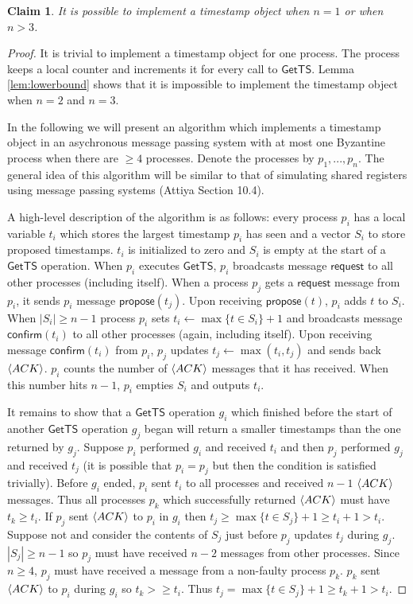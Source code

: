 \documentclass[11pt]{article}
\newcommand\GetTS{\mathsf{GetTS}}
\newcommand\request{\mathsf{request}}
\newcommand\propose{\mathsf{propose}}
\newcommand\confirm{\mathsf{confirm}}
\newtheorem{claim}[theorem]{Claim}
\DeclarePairedDelimiter\anglebrac{\langle}{\rangle}
\begin{document}
\begin{claim}
It is possible to implement a timestamp object when $n = 1$ or when $n > 3$.
\end{claim}
\begin{proof}
It is trivial to implement a timestamp object for one process. The process keeps a local counter and increments it for every call to $\GetTS$. Lemma \ref{lem:lowerbound} shows that it is impossible to implement the timestamp object when $n = 2$ and $n = 3$. 

In the following we will present an algorithm which implements a timestamp object in an asychronous message passing system with at most one Byzantine process when there are $\geq 4$ processes. Denote the processes by $p_1, ..., p_n$. The general idea of this algorithm will be similar to that of simulating shared registers using message passing systems (Attiya Section 10.4).

A high-level description of the algorithm is as follows: every process $p_i$ has a local variable $t_i$ which stores the largest timestamp $p_i$ has seen and a vector $S_i$ to store proposed timestamps. $t_i$ is initialized to zero and $S_i$ is empty at the start of a $\GetTS$ operation. When $p_i$ executes $\GetTS$, $p_i$ broadcasts message $\request$ to all other processes (including itself). When a process $p_j$ gets a $\request$ message from $p_i$, it sends $p_i$ message $\propose(t_j)$. Upon receiving $\propose(t)$, $p_i$ adds $t$ to $S_i$. When $|S_i| \geq n-1$ process $p_i$ sets $t_i \leftarrow \max \{t \in S_i\} + 1$ and broadcasts message $\confirm(t_i)$ to all other processes (again, including itself). Upon receiving message $\confirm(t_i)$ from $p_i$, $p_j$ updates $t_j \leftarrow \max(t_i,t_j)$ and sends back $\anglebrac{ACK}$. $p_i$ counts the number of $\anglebrac{ACK}$ messages that it has received. When this number hits $n-1$, $p_i$ empties $S_i$ and outputs $t_i$.  

It remains to show that a $\GetTS$ operation $g_i$ which finished before the start of another $\GetTS$ operation $g_j$ began will return a smaller timestamps than the one returned by $g_j$. Suppose $p_i$ performed $g_i$ and received $t_i$ and then $p_j$ performed $g_j$ and received $t_j$ (it is possible that $p_i = p_j$ but then the condition is satisfied trivially). Before $g_i$ ended, $p_i$ sent $t_i$ to all processes and received $n-1$ $\anglebrac{ACK}$ messages. Thus all processes $p_k$ which successfully returned $\anglebrac{ACK}$ must have $t_k \geq t_i$. If $p_j$ sent $\anglebrac{ACK}$ to $p_i$ in $g_i$ then $t_j \geq \max\{t\in S_j\} + 1 \geq t_i + 1 > t_i$. Suppose not and consider the contents of $S_j$ just before $p_j$ updates $t_j$ during $g_j$. $|S_j| \geq n-1$ so $p_j$ must have received $n-2$ messages from other processes. Since $n \geq 4$, $p_j$ must have received a message from a non-faulty process $p_k$. $p_k$ sent $\anglebrac{ACK}$ to $p_i$ during $g_i$ so $t_k >
\geq t_i$. Thus $t_j = \max\{t\in S_j\} + 1 \geq t_k + 1 > t_i$.   
\end{proof}
\end{document}
